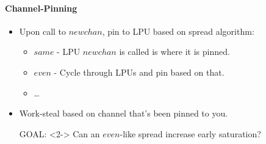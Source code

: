 \begin{slide}
    \framesubtitle{Channel-Pinning}

    \begin{itemize}
        \item Upon call to $newchan$, pin to LPU based on spread algorithm:
            \begin{itemize}
                \item $same$ - LPU $newchan$ is called is where it is pinned.
                \item $even$ - Cycle through LPUs and pin based on that.
                \item \ldots
            \end{itemize}

        \item Work-steal based on channel that's been pinned to you.

        \item[GOAL:]<2-> Can an $even$-like spread increase early saturation?
    \end{itemize}

\end{slide}


